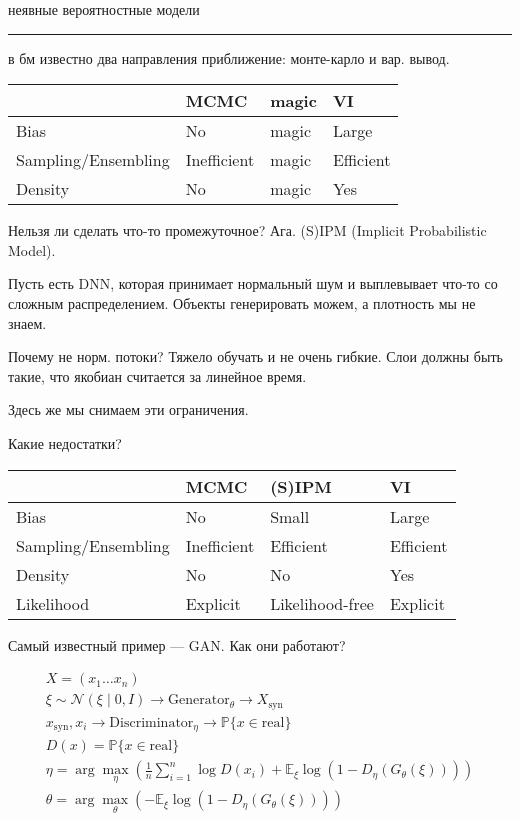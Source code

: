 \documentclass{book}
\begin{document}
неявные вероятностные модели
\hrule
в бм известно два направления приближение: монте-карло и вар. вывод.

\begin{tabular}{l|l|l|l}
  &MCMC&magic&VI\\
  \hline
  Bias&No&magic&Large\\
  Sampling/Ensembling&Inefficient&magic&Efficient\\
  Density&No&magic&Yes\\
\end{tabular}

Нельзя ли сделать что-то промежуточное? Ага. (S)IPM (Implicit Probabilistic Model).

Пусть есть DNN, которая принимает нормальный шум и выплевывает что-то со сложным распределением. Объекты генерировать можем, а плотность мы не знаем.

Почему не норм. потоки? Тяжело обучать и не очень гибкие. Слои должны быть такие, что якобиан считается за линейное время.

Здесь же мы снимаем эти ограничения.

Какие недостатки?\\
\begin{tabular}{l|l|l|l}
  &MCMC&(S)IPM&VI\\
  \hline
  Bias&No&Small&Large\\
  Sampling/Ensembling&Inefficient&Efficient&Efficient\\
  Density&No&No&Yes\\
  Likelihood&Explicit&Likelihood-free&Explicit\\
\end{tabular}

Самый известный пример --- GAN.
Как они работают?

\begin{gather*}
  X=(x_1 \dots x_n)\\
  \xi \sim \mathcal{N}(\xi \mid 0, I) \rightarrow \mathrm{Generator}_\theta \rightarrow X_\mathrm{syn}\\
  x_\mathrm{syn},x_i \rightarrow\mathrm{Discriminator}_\eta \rightarrow \mathbb{P}\{x\in \mathrm{real}\}\\
  D(x)=\mathbb{P}\{x\in \mathrm{real}\}\\
  \eta = \arg\max_\eta \left(\frac{1}{n}\sum_{i=1}^{n} {\log D(x_i)}+\mathbb{E}_\xi \log \left(1-D_\eta\left(G_\theta(\xi)\right)\right)\right)\\
  \theta=\arg\max_\theta \left(-\mathbb{E}_\xi \log \left(1-D_\eta\left(G_\theta\left(\xi\right)\right)\right)\right)
\end{gather*}
\end{document}
